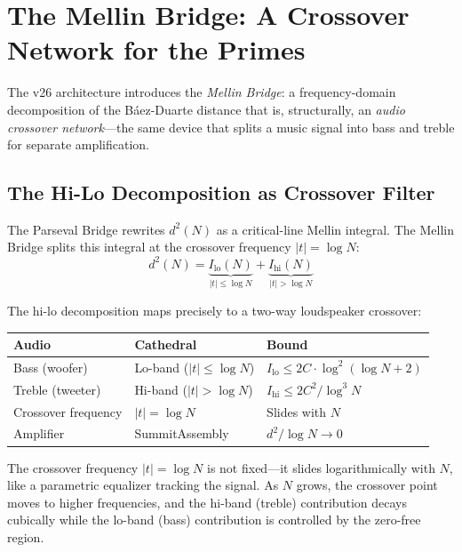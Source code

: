 \documentclass[11pt,a4paper]{article}
\begin{document}


\section{The Mellin Bridge: A Crossover Network for the Primes}
\label{sec:crossover}

The v26 architecture introduces the \emph{Mellin Bridge}: a
frequency-domain decomposition of the B\'aez-Duarte distance
that is, structurally, an \emph{audio crossover network}---the
same device that splits a music signal into bass and treble
for separate amplification.

\subsection{The Hi-Lo Decomposition as Crossover Filter}

The Parseval Bridge rewrites $d^2(N)$ as a critical-line
Mellin integral. The Mellin Bridge splits this integral at the
crossover frequency $|t| = \log N$:
\[
  d^2(N) = \underbrace{I_{\mathrm{lo}}(N)}_{|t| \leq \log N}
  + \underbrace{I_{\mathrm{hi}}(N)}_{|t| > \log N}
\]

\begin{correspondence}
\label{corr:crossover}
The hi-lo decomposition maps precisely to a two-way loudspeaker
crossover:
\begin{center}
\begin{tabular}{@{}lll@{}}
\toprule
\textbf{Audio} & \textbf{Cathedral} & \textbf{Bound} \\
\midrule
Bass (woofer) & Lo-band ($|t| \leq \log N$) &
  $I_{\mathrm{lo}} \leq 2C \cdot \log^2(\log N + 2)$ \\
Treble (tweeter) & Hi-band ($|t| > \log N$) &
  $I_{\mathrm{hi}} \leq 2C^2/\log^3 N$ \\
Crossover frequency & $|t| = \log N$ & Slides with $N$ \\
Amplifier & SummitAssembly & $d^2/\log N \to 0$ \\
\bottomrule
\end{tabular}
\end{center}

The crossover frequency $|t| = \log N$ is not fixed---it slides
logarithmically with $N$, like a parametric equalizer tracking the
signal. As $N$ grows, the crossover point moves to higher frequencies,
and the hi-band (treble) contribution decays cubically while the
lo-band (bass) contribution is controlled by the zero-free region.
\end{correspondence}
\end{document}
